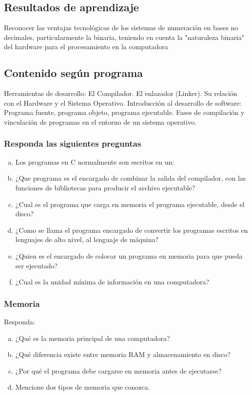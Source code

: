 \subsection*{Resultados de aprendizaje}
Reconocer las ventajas tecnológicas de los sistemas de numeración en bases no decimales, particularmente la binaria, teniendo en cuenta la "naturaleza binaria" del hardware para el procesamiento en la computadora

\subsection*{Contenido según programa}
Herramientas de desarrollo: El Compilador. El enlazador (Linker). Su relación con el Hardware y el Sistema Operativo. Introducción al desarrollo de software: Programa fuente, programa objeto, programa ejecutable.  Fases de compilación y vinculación de programas en el entorno de un sistema operativo.

\setcounter{subsection}{1}

\begin{ejercicioClase}
    \subsubsection{Responda las siguientes preguntas}
    \begin{enumerate}[a)]
      \item Los programas en C normalmente son escritos en un:
      \item ¿Que programa es el encargado de combinar la salida del compilador, con las funciones de bibliotecas para producir el archivo ejecutable?
      \item ¿Cual es el programa que carga en memoria el programa ejecutable, desde el disco?
      \item ¿Como se llama el programa encargado de convertir los programas escritos en lenguajes de alto nivel, al lenguaje 
        de máquina?
      \item ¿Quien es el encargado de colocar un programa en memoria para que pueda ser ejecutado?
      \item ¿Cual es la unidad mínima de información en una computadora?
    \end{enumerate}


    \subsubsection{Memoria}
    Responda:
    \begin{enumerate}[a)]
      \item ¿Qué es la memoria principal de una computadora?
      \item ¿Qué diferencia existe entre memoria RAM y almacenamiento en disco?
      \item ¿Por qué el programa debe cargarse en memoria antes de ejecutarse?
      \item Mencione dos tipos de memoria que conozca.
    \end{enumerate}

\end{ejercicioClase}



